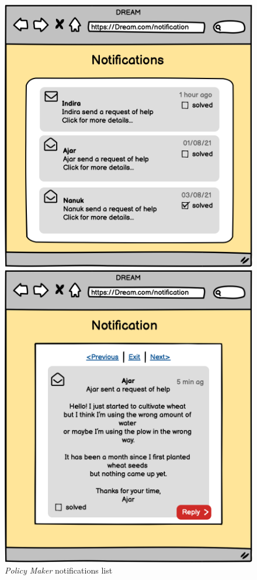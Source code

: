 \begin{figure}[ht!]
    \begin{minipage}{0.5\textwidth}
        \centering
        \includegraphics[width=1\textwidth]{mockups/PMNotifications.png}
        \caption{\emph{Policy Maker} notifications list}
        \label{fig:PMnotifications}
    \end{minipage}\hfill
    \begin{minipage}{0.47\textwidth}
        \centering
        \includegraphics[width=1\textwidth]{mockups/PMNotification.png}

\end{minipage}
\end{figure}
